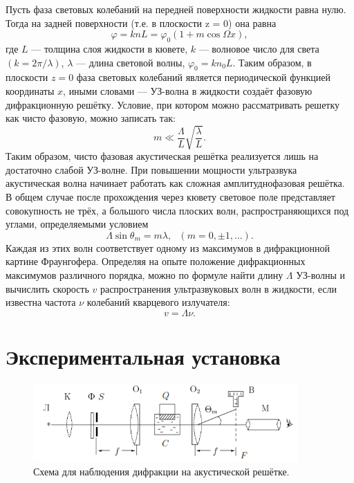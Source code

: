 \documentclass[a4paper, 14pt]{extarticle}%
\newcommand\ECaption[1]{%
     \captionsetup{font=footnotesize}%
     \caption{#1}}
\begin{document}
Пусть фаза световых колебаний на передней поверхности жидкости
равна нулю. Тогда на задней поверхности (т.е. в плоскости z = 0) она
равна
\begin{equation}
\varphi = knL = \varphi_0(1+m\cos\Omega x),
\end{equation}
где $L$ — толщина слоя жидкости в кювете, $k$ — волновое число для света $(k = 2\pi/\lambda)$, $\lambda$ — длина световой волны, $\varphi_0 = kn_0L$. Таким образом,
в плоскости $z = 0$ фаза световых колебаний является периодической
функцией координаты $x$, иными словами — УЗ-волна в жидкости создаёт фазовую дифракционную решётку. Условие, при котором можно рассматривать решетку как чисто фазовую, можно записать так:
\begin{equation}
m\ll \frac{\Lambda}{L}\sqrt{\dfrac{\lambda}{L}}.
\end{equation}
Таким образом, чисто фазовая акустическая решётка реализуется лишь
на достаточно слабой УЗ-волне. При повышении мощности ультразвука акустическая волна начинает работать как сложная амплитуднофазовая решётка.
В общем
случае после прохождения через кювету световое поле представляет
совокупность не трёх, а большого числа плоских волн, распространяющихся под углами, определяемыми условием
\begin{equation}
\Lambda\sin \theta_m = m\lambda, \text{ } (m = 0, \pm 1,...).
\end{equation}
Каждая из этих волн соответствует одному из максимумов в дифракционной картине Фраунгофера.
Определяя на опыте положение дифракционных максимумов различного порядка, можно по формуле найти длину $\Lambda$ УЗ-волны и
вычислить скорость $v$ распространения ультразвуковых волн в жидкости, если известна частота $\nu$ колебаний кварцевого излучателя:
\begin{equation}
v = \Lambda \nu.
\end{equation}


\section*{Экспериментальная установка}

\begin{figure}[h]
\begin{center}
\includegraphics[width=0.9\textwidth]{ust}
\end{center}
\ECaption{Схема для наблюдения дифракции на акустической решётке.}
\end{figure}
\end{document}
